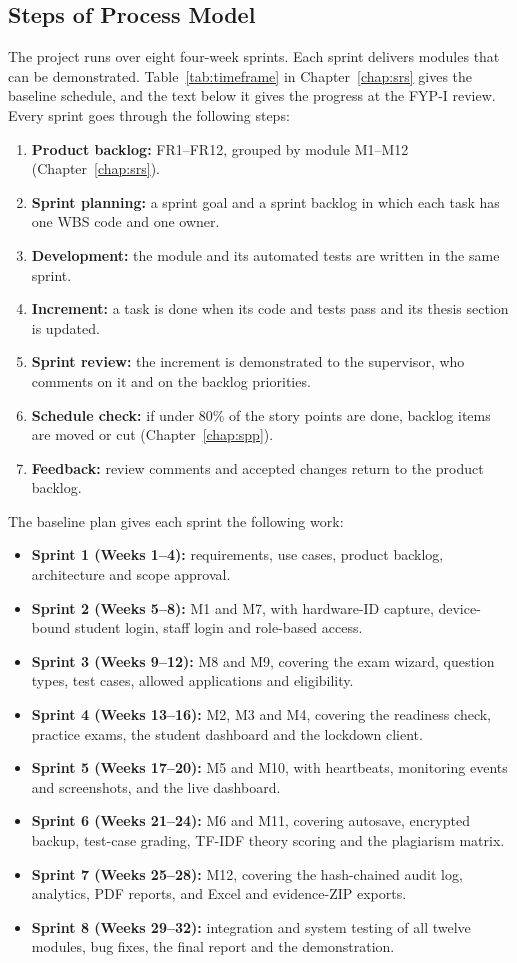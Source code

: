 \subsection{Steps of Process Model}

The project runs over eight four-week sprints. Each sprint delivers modules that can be demonstrated. Table~\ref{tab:timeframe} in Chapter~\ref{chap:srs} gives the baseline schedule, and the text below it gives the progress at the FYP-I review. Every sprint goes through the following steps:
\begin{enumerate}[noitemsep]
\item \textbf{Product backlog:} FR1--FR12, grouped by module M1--M12 (Chapter~\ref{chap:srs}).
\item \textbf{Sprint planning:} a sprint goal and a sprint backlog in which each task has one WBS code and one owner.
\item \textbf{Development:} the module and its automated tests are written in the same sprint.
\item \textbf{Increment:} a task is done when its code and tests pass and its thesis section is updated.
\item \textbf{Sprint review:} the increment is demonstrated to the supervisor, who comments on it and on the backlog priorities.
\item \textbf{Schedule check:} if under 80\% of the story points are done, backlog items are moved or cut (Chapter~\ref{chap:spp}).
\item \textbf{Feedback:} review comments and accepted changes return to the product backlog.
\end{enumerate}
The baseline plan gives each sprint the following work:

\begin{itemize}[noitemsep]
\item \textbf{Sprint 1 (Weeks 1--4):} requirements, use cases, product backlog, architecture and scope approval.
\item \textbf{Sprint 2 (Weeks 5--8):} M1 and M7, with hardware-ID capture, device-bound student login, staff login and role-based access.
\item \textbf{Sprint 3 (Weeks 9--12):} M8 and M9, covering the exam wizard, question types, test cases, allowed applications and eligibility.
\item \textbf{Sprint 4 (Weeks 13--16):} M2, M3 and M4, covering the readiness check, practice exams, the student dashboard and the lockdown client.
\item \textbf{Sprint 5 (Weeks 17--20):} M5 and M10, with heartbeats, monitoring events and screenshots, and the live dashboard.
\item \textbf{Sprint 6 (Weeks 21--24):} M6 and M11, covering autosave, encrypted backup, test-case grading, TF-IDF theory scoring and the plagiarism matrix.
\item \textbf{Sprint 7 (Weeks 25--28):} M12, covering the hash-chained audit log, analytics, PDF reports, and Excel and evidence-ZIP exports.
\item \textbf{Sprint 8 (Weeks 29--32):} integration and system testing of all twelve modules, bug fixes, the final report and the demonstration.
\end{itemize}
